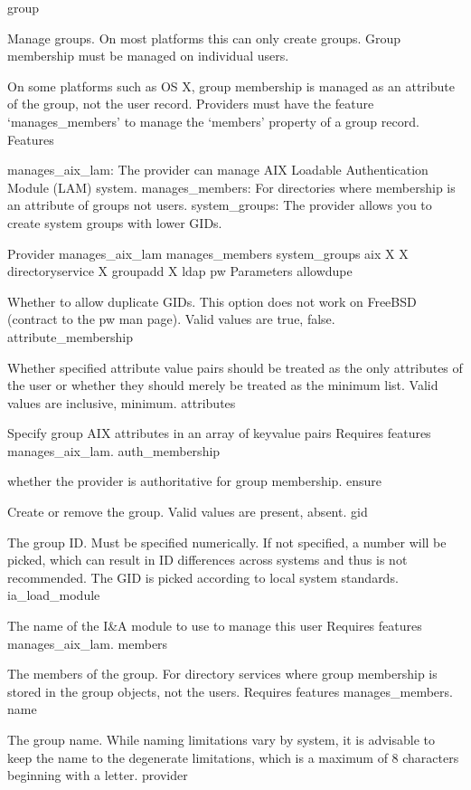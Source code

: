 group

Manage groups. On most platforms this can only create groups. Group membership must be managed on individual users.

On some platforms such as OS X, group membership is managed as an attribute of the group, not the user record. Providers must have the feature ‘manages_members’ to manage the ‘members’ property of a group record.
Features

    manages_aix_lam: The provider can manage AIX Loadable Authentication Module (LAM) system.
    manages_members: For directories where membership is an attribute of groups not users.
    system_groups: The provider allows you to create system groups with lower GIDs.

Provider 	manages_aix_lam 	manages_members 	system_groups
aix 	X 	X 	 
directoryservice 	  	X 	 
groupadd 	  	  	X
ldap 	  	  	 
pw 	  	  	 
Parameters
allowdupe

Whether to allow duplicate GIDs. This option does not work on FreeBSD (contract to the pw man page). Valid values are true, false.
attribute_membership

Whether specified attribute value pairs should be treated as the only attributes of the user or whether they should merely be treated as the minimum list. Valid values are inclusive, minimum.
attributes

Specify group AIX attributes in an array of keyvalue pairs Requires features manages_aix_lam.
auth_membership

whether the provider is authoritative for group membership.
ensure

Create or remove the group. Valid values are present, absent.
gid

The group ID. Must be specified numerically. If not specified, a number will be picked, which can result in ID differences across systems and thus is not recommended. The GID is picked according to local system standards.
ia_load_module

The name of the I&A module to use to manage this user Requires features manages_aix_lam.
members

The members of the group. For directory services where group membership is stored in the group objects, not the users. Requires features manages_members.
name

The group name. While naming limitations vary by system, it is advisable to keep the name to the degenerate limitations, which is a maximum of 8 characters beginning with a letter.
provider

